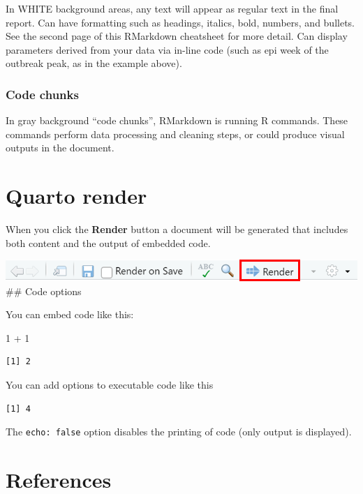 \documentclass[
  letterpaper,
  DIV=11,
  numbers=noendperiod]{scrreprt}
\newenvironment{Shaded}{\begin{snugshade}}{\end{snugshade}}
\newcommand{\DecValTok}[1]{\textcolor[rgb]{0.68,0.00,0.00}{#1}}
\newcommand{\SpecialCharTok}[1]{\textcolor[rgb]{0.37,0.37,0.37}{#1}}
\begin{document}
In WHITE background areas, any text will appear as regular text in the
final report. Can have formatting such as headings, italics, bold,
numbers, and bullets. See the second page of this RMarkdown cheatsheet
for more detail. Can display parameters derived from your data via
in-line code (such as epi week of the outbreak peak, as in the example
above).

\hypertarget{code-chunks}{%
\subsubsection{Code chunks}\label{code-chunks}}

In gray background ``code chunks'', RMarkdown is running R commands.
These commands perform data processing and cleaning steps, or could
produce visual outputs in the document.

\hypertarget{quarto-render}{%
\section{Quarto render}\label{quarto-render}}

When you click the \textbf{Render} button a document will be generated
that includes both content and the output of embedded code.

\includegraphics{./images/paste-A8386DC4.png} \#\# Code options

You can embed code like this:

\begin{Shaded}
\begin{Highlighting}[]
\DecValTok{1} \SpecialCharTok{+} \DecValTok{1}
\end{Highlighting}
\end{Shaded}

\begin{verbatim}
[1] 2
\end{verbatim}

You can add options to executable code like this

\begin{verbatim}
[1] 4
\end{verbatim}

The \texttt{echo:\ false} option disables the printing of code (only
output is displayed).

\hypertarget{references-1}{%
\section{References}\label{references-1}}
\end{document}
